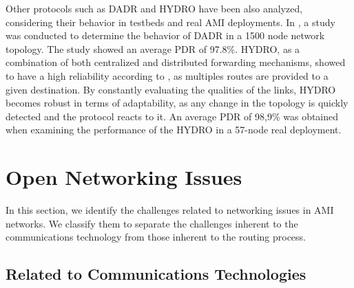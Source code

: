 \documentclass[11pt,draftclsnofoot,onecolumn]{IEEEtran}
\begin{document}
Other protocols such as DADR and HYDRO have been also analyzed, considering their behavior in testbeds and real AMI deployments. In \cite{Iwao2010}, a study was conducted to determine the behavior of DADR in a 1500 node network topology. The study showed an average PDR of 97.8\%. HYDRO, as a combination of both centralized and distributed forwarding mechanisms, showed to have a high reliability according to \cite{Dawson2010}, as multiples routes are provided to a given destination.  By constantly evaluating the qualities of the links, HYDRO becomes robust in terms of adaptability, as any change in the topology is quickly detected and the protocol reacts to it. An average PDR of 98,9\% was obtained when examining the performance of the HYDRO in a 57-node real deployment. 




\section{Open Networking Issues}\label{issues}

In this section, we identify the challenges related to networking issues in AMI networks. We classify them to separate the challenges inherent to the communications technology from those inherent to the routing process.

\subsection{Related to Communications Technologies}
\end{document}
